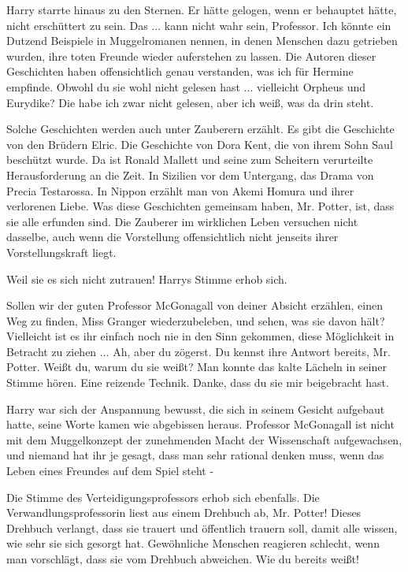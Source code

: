 Harry starrte hinaus zu den Sternen. Er hätte gelogen, wenn er behauptet hätte,
nicht erschüttert zu sein. \glqq{}Das ... kann nicht wahr sein, Professor. Ich
könnte ein Dutzend Beispiele in Muggelromanen nennen, in denen Menschen dazu
getrieben wurden, ihre toten Freunde wieder auferstehen zu lassen. Die Autoren
dieser Geschichten haben offensichtlich genau verstanden, was ich für Hermine
empfinde. Obwohl du sie wohl nicht gelesen hast ... vielleicht Orpheus und
Eurydike? Die habe ich zwar nicht gelesen, aber ich weiß, was da drin
steht.\grqq{}

\glqq{}Solche Geschichten werden auch unter Zauberern erzählt. Es gibt die
Geschichte von den Brüdern Elric. Die Geschichte von Dora Kent, die von ihrem
Sohn Saul beschützt wurde. Da ist Ronald Mallett und seine zum Scheitern
verurteilte Herausforderung an die Zeit. In Sizilien vor dem Untergang, das
Drama von Precia Testarossa. In Nippon erzählt man von Akemi Homura und ihrer
verlorenen Liebe. Was diese Geschichten gemeinsam haben, Mr. Potter, ist, dass
sie alle erfunden sind. Die Zauberer im wirklichen Leben versuchen nicht
dasselbe, auch wenn die Vorstellung offensichtlich nicht jenseits ihrer
Vorstellungskraft liegt.\grqq{}

\glqq{}Weil sie es sich nicht zutrauen!\grqq{} Harrys Stimme erhob sich.

\glqq{}Sollen wir der guten Professor McGonagall von deiner Absicht erzählen,
einen Weg zu finden, Miss Granger wiederzubeleben, und sehen, was sie davon
hält? Vielleicht ist es ihr einfach noch nie in den Sinn gekommen, diese
Möglichkeit in Betracht zu ziehen ... Ah, aber du zögerst. Du kennst ihre Antwort
bereits, Mr. Potter. Weißt du, warum du sie weißt?\grqq{} Man konnte das kalte
Lächeln in seiner Stimme hören. \glqq{}Eine reizende Technik. Danke, dass du sie
mir beigebracht hast.\grqq{}

Harry war sich der Anspannung bewusst, die sich in seinem Gesicht aufgebaut
hatte, seine Worte kamen wie abgebissen heraus. \glqq{}Professor McGonagall ist
nicht mit dem Muggelkonzept der zunehmenden Macht der Wissenschaft aufgewachsen,
und niemand hat ihr je gesagt, dass man sehr rational denken muss, wenn das
Leben eines Freundes auf dem Spiel steht -\grqq{}

Die Stimme des Verteidigungsprofessors erhob sich ebenfalls. \glqq{}Die
Verwandlungsprofessorin liest aus einem Drehbuch ab, Mr. Potter! Dieses Drehbuch
verlangt, dass sie trauert und öffentlich trauern soll, damit alle wissen, wie
sehr sie sich gesorgt hat. Gewöhnliche Menschen reagieren schlecht, wenn man
vorschlägt, dass sie vom Drehbuch abweichen. Wie du bereits weißt!\grqq{}

